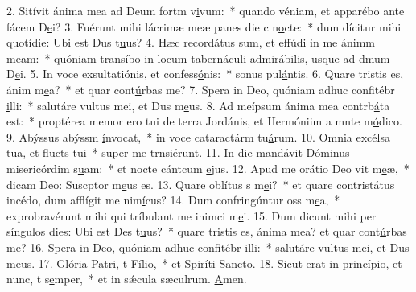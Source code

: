 2. Sitívit ánima mea ad Deum fortm v\uline{i}vum:~* quando véniam, et apparébo ante fácem D\uline{e}i?
3. Fuérunt mihi lácrimæ meæ panes die c n\uline{o}cte:~* dum dícitur mihi quotídie: Ubi est Dus t\uline{u}us?
4. Hæc recordátus sum, et effúdi in me ánimm m\uline{e}am:~* quóniam transíbo in locum tabernáculi admirábilis, usque ad dmum D\uline{e}i.
5. In voce exsultatiónis, et confess\uline{ó}nis:~* sonus pul\uline{á}ntis.
6. Quare tristis es, ánim m\uline{e}a?~* et quar cont\uline{ú}rbas me?
7. Spera in Deo, quóniam adhuc confitébr \uline{i}lli:~* salutáre vultus mei, et Dus m\uline{e}us.
8. Ad meípsum ánima mea contrb\uline{á}ta est:~* proptérea memor ero tui de terra Jordánis, et Hermóniim a mnte m\uline{ó}dico.
9. Abýssus abýssm \uline{í}nvocat,~* in voce cataractárm tu\uline{á}rum.
10. Omnia excélsa tua, et flucts t\uline{u}i~* super me trnsi\uline{é}runt.
11. In die mandávit Dóminus misericórdim s\uline{u}am:~* et nocte cántcum \uline{e}jus.
12. Apud me orátio Deo vit m\uline{e}æ,~* dicam Deo: Suscptor m\uline{e}us es.
13. Quare oblítus s m\uline{e}i?~* et quare contristátus incédo, dum afflígit me nim\uline{í}cus?
14. Dum confringúntur oss m\uline{e}a,~* exprobravérunt mihi qui tríbulant me inimci m\uline{e}i.
15. Dum dicunt mihi per síngulos dies: Ubi est Des t\uline{u}us?~* quare tristis es, ánima mea? et quar cont\uline{ú}rbas me?
16. Spera in Deo, quóniam adhuc confitébr \uline{i}lli:~* salutáre vultus mei, et Dus m\uline{e}us.
17. Glória Patri, t F\uline{í}lio,~* et Spiríti S\uline{a}ncto.
18. Sicut erat in princípio, et nunc, t s\uline{e}mper,~* et in sǽcula sæculrum. \uline{A}men.
